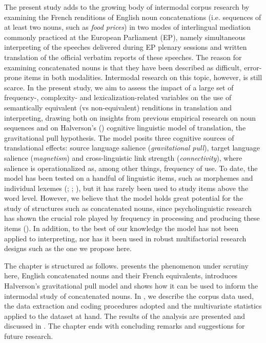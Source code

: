 \documentclass[output=paper]{langscibook}
\begin{document}
The present study adds to the growing body of intermodal corpus research by examining the French renditions of English noun concatenations (i.e. sequences of at least two nouns, such as \textit{food prices}) in two modes of interlingual mediation commonly practiced at the European Parliament (EP), namely simultaneous interpreting of the speeches delivered during EP plenary sessions and written translation of the official verbatim reports of these speeches. The reason for examining concatenated nouns is that they have been described as difficult, error-prone items in both modalities. Intermodal research on this topic, however, is still scarce. In the present study, we aim to assess the impact of a large set of frequency-, complexity- and lexicalization-related variables on the use of semantically equivalent (vs non-equivalent) renditions in translation and interpreting, drawing both on insights from previous empirical research on noun sequences and on Halverson's (\citeyear{Halverson2003,Halverson2007,Halverson2010,Halverson2017}) cognitive linguistic model of translation, the gravitational pull hypothesis. The model posits three cognitive sources of translational effects: source language salience (\textit{gravitational pull}), target language salience (\textit{magnetism}) and cross-linguistic link strength (\textit{connectivity}), where salience is operationalized as, among other things, frequency of use. To date, the model has been tested on a handful of linguistic items, such as morphemes and individual lexemes (\citealt{Hareide2016}; \citealt{Vandevoorde2020}; \citealt{Marco2021}), but it has rarely been used to study items above the word level. However, we believe that the model holds great potential for the study of structures such as concatenated nouns, since psycholinguistic research has shown the crucial role played by frequency in processing and producing these items (\citealt[cf.][]{BaayenEtAl2010}). In addition, to the best of our knowledge the model has not been applied to interpreting, nor has it been used in robust multifactorial research designs such as the one we propose here.

The chapter is structured as follows.  presents the phenomenon under scrutiny here, English concatenated nouns and their French equivalents, introduces Halverson’s gravitational pull model and shows how it can be used to inform the intermodal study of concatenated nouns. In , we describe the corpus data used, the data extraction and coding procedures adopted and the multivariate statistics applied to the dataset at hand. The results of the analysis are presented and discussed in . The chapter ends with concluding remarks and suggestions for future research.
\end{document}
